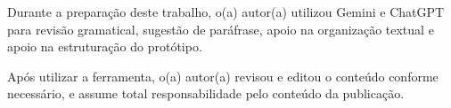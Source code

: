 \clearpage
\thispagestyle{empty}

Durante a preparação deste trabalho, o(a) autor(a) utilizou Gemini e ChatGPT para revisão gramatical, sugestão de paráfrase, apoio na organização textual e apoio na estruturação do protótipo.

Após utilizar a ferramenta, o(a) autor(a) revisou e editou o conteúdo conforme necessário, e assume total responsabilidade pelo conteúdo da publicação.

\clearpage
